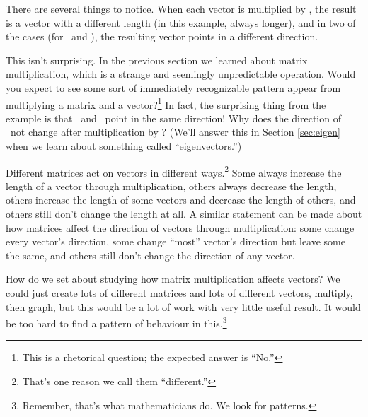 \medskip

There are several things to notice. When each vector is multiplied by \tta, the result is a vector with a different length (in this example, always longer), and in two of the cases (for \vy\ and \vz), the resulting vector points in a different direction. 

This isn't surprising. In the previous section we learned about matrix multiplication, which is a strange and seemingly unpredictable operation. Would you expect to see some sort of immediately recognizable pattern appear from multiplying a matrix and a vector?\footnote{This is a rhetorical question; the expected answer is ``No.''} In fact, the surprising thing from the example is that \vx\ and \tta\vx\ point in the same direction! Why does the direction of \vx\ not change after multiplication by \tta? (We'll answer this in Section \ref{sec:eigen} when we learn about something called ``eigenvectors.'')


Different matrices act on vectors in different ways.\footnote{That's one reason we call them ``different.''} Some always increase the length of a vector through  multiplication, others always decrease the length, others increase the length of some vectors and decrease the length of others, and others still don't change the length at all. A similar statement can be made about how matrices affect the direction of vectors through multiplication: some change every vector's direction, some change ``most'' vector's direction but leave some the same, and others still don't change the direction of any vector.

How do we set about studying how matrix multiplication affects vectors? We could just create lots of different matrices and lots of different vectors, multiply, then graph, but this would be a lot of work with very little useful result. It would be too hard to find a pattern of behaviour in this.\footnote{Remember, that's what mathematicians do. We look for patterns.}


